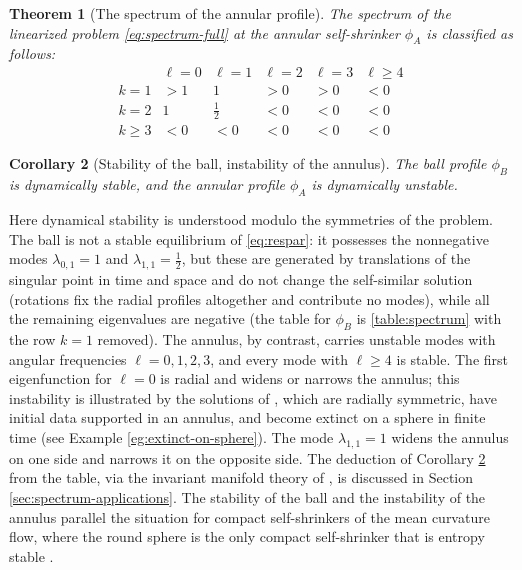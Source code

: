 \documentclass[11pt]{article}
\numberwithin{equation}{section}
\newtheorem{theorem}{Theorem}[section]
\newtheorem{cor}[theorem]{Corollary}
\theoremstyle{definition}
\begin{document}
\begin{theorem}[The spectrum of the annular profile]\label{prop:spectrum-annular}
	The spectrum of the linearized problem \eqref{eq:spectrum-full} at the annular self-shrinker $\phi_A$ is classified as follows:
\begin{equation}\label{table:spectrum}
	\begin{array}{c|c|c|c|c|c}
& \ell=0 & \ell=1 & \ell=2 &\ell=3 & \ell\geq4 \\
\hline
k=1 & >1 & 1 & >0 & >0 &  <0 \\
\hline
k=2 & 1 & \frac12 & <0 & <0 &<0 \\
\hline
k\geq 3 & <0 & <0 & <0 & <0 &<0
\end{array}
\end{equation}
\end{theorem}


\begin{cor}[Stability of the ball, instability of the annulus]\label{cor:stability}
    The ball profile $\phi_B$ is dynamically stable, and the annular profile $\phi_A$ is dynamically unstable.
\end{cor}


Here dynamical stability is understood modulo the symmetries of the problem. The ball is not a stable equilibrium of \eqref{eq:respar}: it possesses the nonnegative modes $\lambda_{0,1}=1$ and $\lambda_{1,1}=\frac12$, but these are generated by translations of the singular point in time and space and do not change the self-similar solution (rotations fix the radial profiles altogether and contribute no modes), while all the remaining eigenvalues are negative (the table for $\phi_B$ is \eqref{table:spectrum} with the row $k=1$ removed). The annulus, by contrast, carries unstable modes with angular frequencies $\ell=0,1,2,3$, and every mode with $\ell\geq4$ is stable. The first eigenfunction for $\ell=0$ is radial and widens or narrows the annulus; this instability is illustrated by the solutions of \cite[Theorem 8.2]{radial}, which are radially symmetric, have initial data supported in an annulus, and become extinct on a sphere in finite time (see Example \ref{eg:extinct-on-sphere}). The mode $\lambda_{1,1}=1$ widens the annulus on one side and narrows it on the opposite side. The deduction of Corollary \ref{cor:stability} from the table, via the invariant manifold theory of \cite{stability}, is discussed in Section \ref{sec:spectrum-applications}. The stability of the ball and the instability of the annulus parallel the situation for compact self-shrinkers of the mean curvature flow, where the round sphere is the only compact self-shrinker that is entropy stable \cite{CM-stable}.
\end{document}
